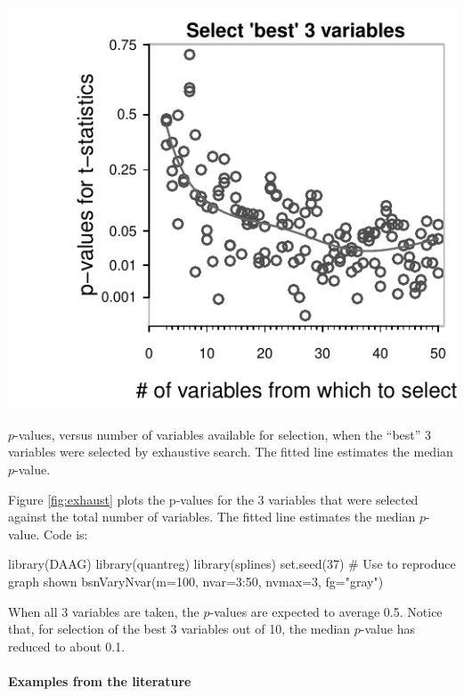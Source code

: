 \begin{marginfigure}
\begin{Schunk}


\centerline{\includegraphics[width=\textwidth]{figs/8-bsnVary-1} }

\end{Schunk}
\caption{$p$-values, versus number of variables available for selection,
  when the ``best'' 3 variables were selected by exhaustive search.
  The fitted line estimates the median $p$-value.\label{fig:exhaust}}
\end{marginfigure}
\noindent

Figure \ref{fig:exhaust} plots the p-values for the 3 variables that
were selected against the total number of variables. The fitted line
estimates the median $p$-value.
Code is:
\begin{Schunk}
\begin{Sinput}
library(DAAG)
library(quantreg)
library(splines)
set.seed(37)   # Use to reproduce graph shown
bsnVaryNvar(m=100, nvar=3:50, nvmax=3, fg="gray")
\end{Sinput}
\end{Schunk}

When all 3 variables are taken, the $p$-values are expected to average
0.5.  Notice that, for selection of the best 3 variables out of 10,
the median $p$-value has reduced to about 0.1.

\paragraph{Examples from the literature}

